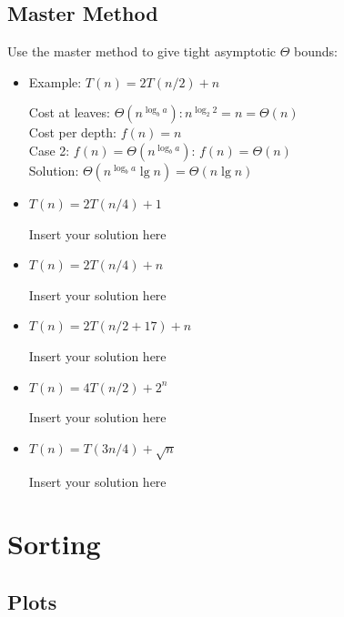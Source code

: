 \documentclass[a4paper]{article}
\begin{document}
\subsection{Master Method}

Use the master method to give tight asymptotic $\Theta$ bounds:

\begin{itemize}

\item Example: $T(n) = 2T(n/2) + n$

Cost at leaves: $\Theta(n^{\log_b a}): n^{\log_2 2}=n=\Theta(n)$ \\
Cost per depth: $f(n)=n$ \\
Case 2: $f(n) = \Theta(n^{\log_b a})$: $f(n) = \Theta(n)$ \\
Solution: $\Theta(n^{\log_b a} \lg n) = \Theta(n \lg n)$

\item $T(n) = 2T(n/4) + 1$

Insert your solution here

\item $T(n) = 2T(n/4) + n$

Insert your solution here

\item $T(n) = 2T(n/2 + 17) + n$

Insert your solution here

\item $T(n) = 4T(n/2) + 2^n$

Insert your solution here

\item $T(n) = T(3n/4) + \sqrt{n}$

Insert your solution here

\end{itemize}

\section{Sorting}

\subsection{Plots}
\end{document}
